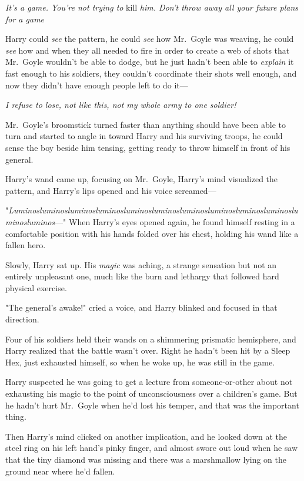 \emph{It's a game. You're not trying to} kill \emph{him. Don't throw away all
your future plans for a game{\el}}

Harry could \emph{see} the pattern, he could \emph{see} how Mr.~Goyle was
weaving, he could \emph{see} how and when they all needed to fire in order to
create a web of shots that Mr.~Goyle wouldn't be able to dodge, but he just
hadn't been able to \emph{explain} it fast enough to his soldiers, they
couldn't coordinate their shots well enough, and now they didn't have enough
people left to do it\mbox{---}

\emph{I refuse to lose, not like this, not my whole army to one soldier!}

Mr.~Goyle's broomstick turned faster than anything should have been able to
turn and started to angle in toward Harry and his surviving troops, he could
sense the boy beside him tensing, getting ready to throw himself in front of
his general.


Harry's wand came up, focusing on Mr.~Goyle, Harry's mind visualized the
pattern, and Harry's lips opened and his voice screamed\mbox{---}

"\emph{Lu\-min\-os\-lu\-min\-os\-lu\-min\-os\-lu\-min\-os\-lu\-min\-os\-lu\-min\-os\-lu\-min\-os\-lu\-min\-os\-lu\-min\-os\-lu\-min\-os\-lu\-min\-os\-lu\-min\-os}\mbox{---}"
\sbreak
When Harry's eyes opened again, he found himself resting in a comfortable
position with his hands folded over his chest, holding his wand like a fallen
hero.

Slowly, Harry sat up. His \emph{magic} was aching, a strange sensation but not
an entirely unpleasant one, much like the burn and lethargy that followed hard
physical exercise.

"The general's awake!" cried a voice, and Harry blinked and focused in that
direction.

Four of his soldiers held their wands on a shimmering prismatic hemisphere, and
Harry realized that the battle wasn't over. Right{\el} he hadn't been hit by
a Sleep Hex, just exhausted himself, so when he woke up, he was still in the
game.

Harry suspected he was going to get a lecture from someone-or-other about not
exhausting his magic to the point of unconsciousness over a children's game.
But he hadn't hurt Mr.~Goyle when he'd lost his temper, and that was the
important thing.

Then Harry's mind clicked on another implication, and he looked down at the
steel ring on his left hand's pinky finger, and almost swore out loud when he
saw that the tiny diamond was missing and there was a marshmallow lying on the
ground near where he'd fallen.

